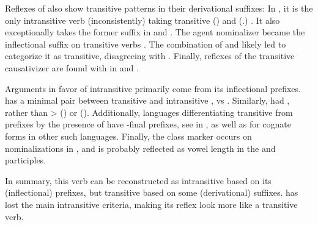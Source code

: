 Reflexes of   also show transitive patterns in their derivational suffixes:
In \trio, it is the only intransitive verb (inconsistently) taking transitive  () and  (.) \parencite[263, 169]{triomeira1999}.
It also exceptionally takes the former suffix in \kalina \parencite[82]{courtz2008carib} and \wayana \parencite[258]{wayanatavares2005}.
The agent nominalizer  became the \panare inflectional suffix  on transitive verbs \parencite[184--185]{gildea1998}.
The combination of  and  likely led \textcite[214]{panarepayne2013} to categorize it as transitive, disagreeing with  \textcite[102]{mattei1994diccionario}.
Finally, reflexes of the transitive causativizer  \parencite{gildea2015valency} are found with  in \apalai \parencite[51]{koehn1986apalai} and \waiwai \parencite[52]{waiwaihawkins1998}.

Arguments in favor of intransitive  primarily come from its inflectional prefixes.
\kalina has a minimal pair between transitive   and intransitive  ,   vs   \parencite[288, 45]{courtz2008carib}.
Similarly, \PPek {}  had   , rather than >  (\bakairi) or  (\PXin).
Additionally, languages differentiating transitive from  prefixes by the presence of  \parencite[495]{meira2010origin} have -final prefixes, see \akuriyo in , as well as \textcites[294]{triomeira1999}[195]{wayanatavares2005}[288]{ikpengpacheco2001}[150]{alves2017arara}[168]{hoff1968carib} for cognate forms in other such languages.
Finally, the  class marker  occurs on nominalizations in \kalina {}, and is probably reflected as vowel length in the \trio \parencite[333]{triomeira1999} and \wayana \parencite[196]{wayanatavares2005} participles.



In summary, this verb can be reconstructed as intransitive based on its (inflectional) prefixes, but transitive based on some (derivational) suffixes.
\hixka has lost the main intransitive criteria, making its reflex look more like a transitive verb.

